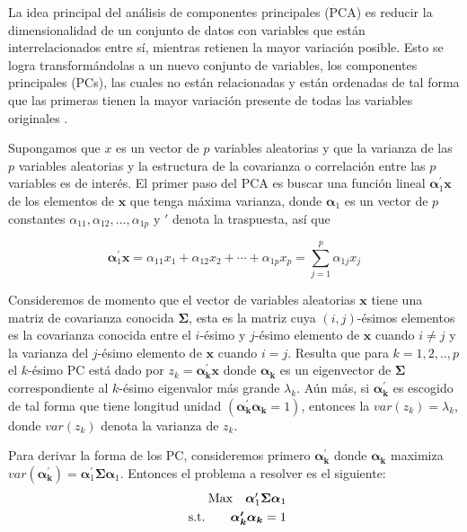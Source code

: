 La idea principal del análisis de componentes principales (PCA) es reducir la dimensionalidad de un conjunto de datos con variables que están interrelacionados entre sí, mientras retienen la mayor variación posible. Esto se logra transformándolas a un nuevo conjunto de variables, los componentes principales (PCs), las cuales no están relacionadas y están ordenadas de tal forma que las primeras tienen la mayor variación presente de todas las variables originales \cite{jolliffePrincipalComponentAnalysis2002}.

Supongamos que $x$ es un vector de $p$ variables aleatorias y que la varianza de las $p$ variables aleatorias y la estructura de la covarianza o correlación entre las $p$ variables es de interés. El primer paso del PCA es buscar una función lineal $\boldsymbol{\alpha}_1^\prime \boldsymbol{x}$ de los elementos de $\boldsymbol{x}$ que tenga máxima varianza, donde $\boldsymbol{\alpha}_{1}$ es un vector de $p$ constantes $\alpha_{11},\alpha_{12},...,\alpha_{1p}$ y $\prime$ denota la traspuesta, así que

\[
\boldsymbol{\alpha}_{1}^{\prime} \boldsymbol{x}=\alpha_{11} x_{1}+\alpha_{12} x_{2}+\cdots+\alpha_{1 p} x_{p}=\sum_{j=1}^{p} \alpha_{1 j} x_{j}
\] 

Consideremos de momento que el vector de variables aleatorias $\boldsymbol{x}$ tiene una matriz de covarianza conocida $\boldsymbol{\Sigma}$, esta es la matriz cuya $(i,j)$-ésimos elementos es la covarianza conocida entre el $i$-ésimo y $j$-ésimo elemento de $\boldsymbol{x}$ cuando $i \neq j$ y la varianza del $j$-ésimo elemento de $\boldsymbol{x}$ cuando $i = j$. Resulta que para $k=1,2,..,p$ el $k$-ésimo PC está dado por $z_k = \boldsymbol{\alpha_k^\prime} \boldsymbol{x}$ donde $\boldsymbol{\alpha_k}$ es un eigenvector de $\boldsymbol{\Sigma}$ correspondiente al $k$-ésimo eigenvalor más grande $\lambda_k$. Aún más, si $\boldsymbol{\alpha_k^\prime}$ es escogido de tal forma que tiene longitud unidad $(\boldsymbol{\alpha_k^\prime}\boldsymbol{\alpha_k}=1)$, entonces la $var(z_k)=\lambda_k$, donde $var(z_k)$ denota la varianza de $z_k$.

Para derivar la forma de los PC, consideremos primero $\boldsymbol{\alpha_k^\prime}$ donde $\boldsymbol{\alpha_k}$ maximiza $var(\boldsymbol{\alpha_k^\prime})= \boldsymbol{\alpha}_{1}^{\prime} \boldsymbol{\Sigma} \boldsymbol{\alpha}_{1}$. Entonces el problema a resolver es el siguiente:
\[
\begin{array}{r@{}r@{}r@{}l}
	\text{Max} \quad \boldsymbol{\alpha}_{1}^{\prime} \boldsymbol{\Sigma} \boldsymbol{\alpha}_{1} \\[\jot]
	\text{s.t.}\qquad \boldsymbol{\alpha_k^\prime}\boldsymbol{\alpha_k}=1 \\
	
\end{array}
\]

